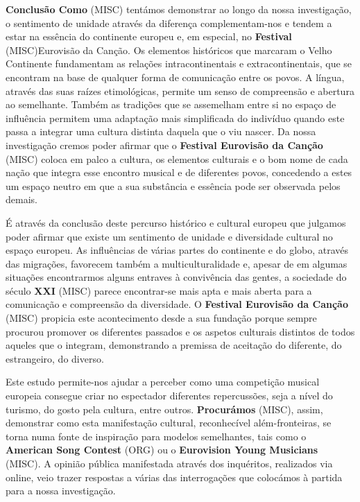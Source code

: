\documentclass[12pt,a4paper]{article}
\begin{document}
\textbf{Conclusão Como} (MISC)  tentámos  demonstrar  ao  longo  da  nossa  investigação,  o  sentimento  de unidade  através  da  diferença  complementam-nos  e  tendem  a  estar  na  essência  do continente  europeu  e,  em  especial,  no  \textbf{Festival} (MISC)Eurovisão  da  Canção.  Os  elementos históricos que marcaram o Velho Continente fundamentam as relações intracontinentais e extracontinentais, que se encontram na base de qualquer forma de comunicação entre os  povos.  A  língua,  através  das  suas  raízes  etimológicas,  permite  um  senso  de compreensão e abertura ao semelhante. Também as tradições que se assemelham entre si no espaço de influência permitem uma adaptação mais simplificada do indivíduo quando este passa a integrar uma cultura distinta daquela que o viu nascer. Da nossa investigação cremos poder afirmar que o \textbf{Festival Eurovisão da Canção} (MISC) coloca em palco a cultura, os elementos culturais e o bom nome de cada nação que integra esse encontro musical e de diferentes povos, concedendo a estes um espaço neutro em que a sua substância e essência pode ser observada pelos demais.

É através da conclusão deste percurso histórico e cultural europeu que julgamos poder  afirmar  que  existe  um  sentimento  de  unidade  e  diversidade  cultural  no  espaço europeu. As influências de várias partes do continente e do globo, através das migrações, favorecem também a multiculturalidade e, apesar de em algumas situações encontrarmos alguns entraves à convivência das gentes, a sociedade do século \textbf{XXI} (MISC) parece encontrar-se mais apta e mais aberta para a comunicação e compreensão  da diversidade. O \textbf{Festival Eurovisão da Canção} (MISC) propicia este acontecimento desde a sua fundação porque sempre procurou promover os diferentes passados e os aspetos culturais distintos de todos aqueles que o integram, demonstrando a premissa de aceitação do diferente, do estrangeiro, do diverso.

Este estudo permite-nos ajudar a perceber como uma competição musical europeia consegue criar no espectador diferentes repercussões, seja a nível do turismo, do gosto pela  cultura,  entre  outros.  \textbf{Procurámos} (MISC),  assim,  demonstrar  como  esta  manifestação cultural, reconhecível além-fronteiras, se torna numa fonte de inspiração para modelos semelhantes, tais como o \textbf{American Song Contest} (ORG) ou o \textbf{Eurovision Young Musicians} (MISC). A opinião  pública  manifestada  através  dos  inquéritos,  realizados  via  online,  veio  trazer respostas a várias das interrogações que colocámos à partida para a nossa investigação.
\end{document}
